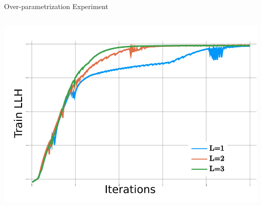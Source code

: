 \begin{frame}{Over-parametrization Experiment}
\begin{columns}
\begin{column}{\linewidth}
\includegraphics[width=\textwidth]{nltcs_experiment}
\end{column}
\end{columns}
\end{frame}

